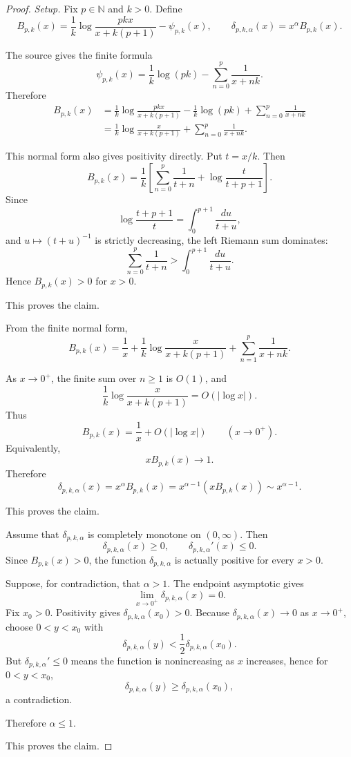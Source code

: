 \begin{proof}
\emph{Setup.}
Fix \(p\in\mathbb N\) and \(k>0\). Define
\[
B_{p,k}(x)=
\frac1k\log\frac{pkx}{x+k(p+1)}-\psi_{p,k}(x),
\qquad
\delta_{p,k,\alpha}(x)=x^\alpha B_{p,k}(x).
\]

The source gives the finite formula
\[
\psi_{p,k}(x)=\frac1k\log(pk)-\sum_{n=0}^p\frac1{x+nk}.
\]
Therefore
\[
\begin{aligned}
B_{p,k}(x)
&=
\frac1k\log\frac{pkx}{x+k(p+1)}
-\frac1k\log(pk)
+\sum_{n=0}^p\frac1{x+nk}  \\
&=
\frac1k\log\frac{x}{x+k(p+1)}
+\sum_{n=0}^p\frac1{x+nk}.
\end{aligned}
\]

This normal form also gives positivity directly. Put \(t=x/k\). Then
\[
B_{p,k}(x)
=\frac1k\left[
\sum_{n=0}^p\frac1{t+n}
+\log\frac{t}{t+p+1}
\right].
\]
Since
\[
\log\frac{t+p+1}{t}=\int_0^{p+1}\frac{du}{t+u},
\]
and \(u\mapsto(t+u)^{-1}\) is strictly decreasing, the left Riemann sum dominates:
\[
\sum_{n=0}^p\frac1{t+n}
>
\int_0^{p+1}\frac{du}{t+u}.
\]
Hence \(B_{p,k}(x)>0\) for \(x>0\).

This proves the claim.

From the finite normal form,
\[
B_{p,k}(x)
=\frac1x
+\frac1k\log\frac{x}{x+k(p+1)}
+\sum_{n=1}^p\frac1{x+nk}.
\]

As \(x\to0^+\), the finite sum over \(n\ge1\) is \(O(1)\), and
\[
\frac1k\log\frac{x}{x+k(p+1)}=O(|\log x|).
\]
Thus
\[
B_{p,k}(x)=\frac1x+O(|\log x|)
\qquad (x\to0^+).
\]
Equivalently,
\[
xB_{p,k}(x)\to1.
\]
Therefore
\[
\delta_{p,k,\alpha}(x)
=x^\alpha B_{p,k}(x)
=x^{\alpha-1}(xB_{p,k}(x))
\sim x^{\alpha-1}.
\]

This proves the claim.

Assume that \(\delta_{p,k,\alpha}\) is completely monotone on \((0,\infty)\). Then
\[
\delta_{p,k,\alpha}(x)\ge0,\qquad
\delta_{p,k,\alpha}'(x)\le0.
\]
Since \(B_{p,k}(x)>0\), the function \(\delta_{p,k,\alpha}\) is actually positive for every \(x>0\).

Suppose, for contradiction, that \(\alpha>1\). The endpoint asymptotic gives
\[
\lim_{x\to0^+}\delta_{p,k,\alpha}(x)=0.
\]
Fix \(x_0>0\). Positivity gives \(\delta_{p,k,\alpha}(x_0)>0\). Because \(\delta_{p,k,\alpha}(x)\to0\) as \(x\to0^+\), choose \(0<y<x_0\) with
\[
\delta_{p,k,\alpha}(y)<\frac12\delta_{p,k,\alpha}(x_0).
\]
But \(\delta_{p,k,\alpha}'\le0\) means the function is nonincreasing as \(x\) increases, hence for \(0<y<x_0\),
\[
\delta_{p,k,\alpha}(y)\ge\delta_{p,k,\alpha}(x_0),
\]
a contradiction.

Therefore \(\alpha\le1\).

This proves the claim.
\end{proof}


